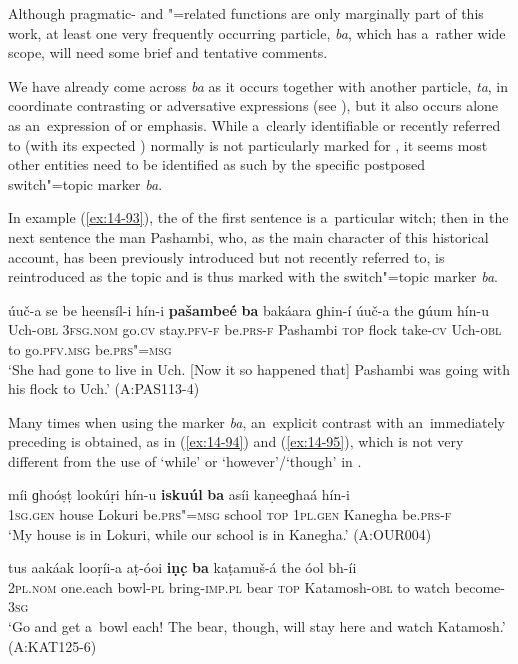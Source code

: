 Although pragmatic- and "=related functions are only marginally part of this work, at least one very frequently occurring particle, \textit{ba}, which has a~rather wide scope, will need some brief and tentative comments.



We have already come across \textit{ba} as it occurs together with another particle, \textit{ta}, in coordinate contrasting or adversative expressions (see ), but it also occurs alone as an~expression of  or emphasis. While a~clearly identifiable or recently referred to  (with its expected ) normally is not particularly marked for , it seems most other entities need to be identified as such by the specific postposed switch"=topic \citep[149]{andrews2007} marker \textit{ba}.



In example (\ref{ex:14-93}), the  of the first sentence is a~particular witch; then in the next sentence the man Pashambi, who, as the main character of this historical account, has been previously introduced but not recently referred to, is reintroduced as the topic   and is thus marked with the switch"=topic marker \textit{ba}.

\begin{exe}
\ex
\label{ex:14-93}
\gll úuč-a se  be heensíl-i  hín-i \textbf{pašambeé} \textbf{ba} bakáara ɡhin-í úuč-a the ɡúum hín-u \\
Uch-\textsc{obl} \textsc{3fsg.nom} go.\textsc{cv} stay.\textsc{pfv-f} be.\textsc{prs-f} Pashambi  \textsc{top} flock take-\textsc{cv} Uch-\textsc{obl} to go.\textsc{pfv.msg} be.\textsc{prs"=msg} \\
\glt `She had gone to live in Uch. [Now it so happened that] Pashambi was going with his flock to Uch.' (A:PAS113-4)
\end{exe}

Many times when using the marker \textit{ba}, an~explicit contrast with an~immediately preceding  is obtained, as in (\ref{ex:14-94}) and (\ref{ex:14-95}), which is not very different from the use of `while' or `however'/`though' in \iliEnglish.

\begin{exe}
\ex
\label{ex:14-94}
\gll míi ɡhoóṣṭ lookúṛi hín-u \textbf{iskuúl} \textbf{ba} asíi kaṇeeɡhaá hín-i\\
\textsc{1sg.gen} house Lokuri be.\textsc{prs"=msg} school \textsc{top} \textsc{1pl.gen} Kanegha be.\textsc{prs-f}\\
\glt `My house is in Lokuri, while our school is in Kanegha.' (A:OUR004)

\ex
\label{ex:14-95}
\gll tus aakáak looṛíi-a aṭ-óoi \textbf{iṇc̣} \textbf{ba}  kaṭamuš-á the óol bh-íi \\
\textsc{2pl.nom} one.each bowl-\textsc{pl} bring-\textsc{imp.pl} bear \textsc{top} Katamosh-\textsc{obl} to watch become-\textsc{3sg } \\
\glt `Go and get a~bowl each! The bear, though, will stay here and watch Katamosh.' (A:KAT125-6)
\end{exe}

